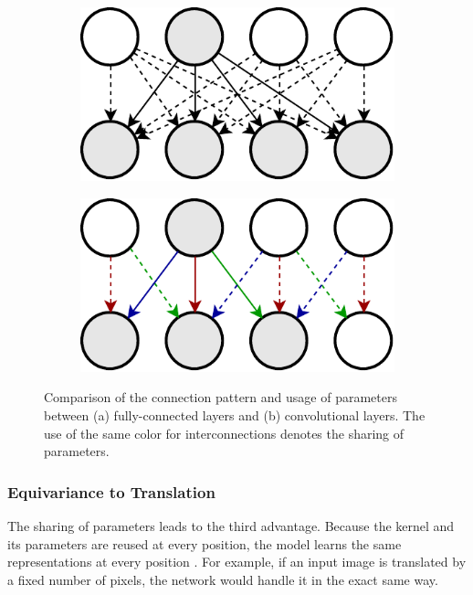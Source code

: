 \begin{figure}[htpb]
\centering
\begin{subfigure}{0.5\textwidth}
  \centering
  \includegraphics[width=.8\linewidth]{figures/fc2.pdf}
  \caption{}
  \label{fig:conv_vs_fc_fc}
\end{subfigure}%
\begin{subfigure}{0.5\textwidth}
  \centering
  \includegraphics[width=0.8\linewidth]{figures/param_share.pdf}
  \caption{}
  \label{fig:conv_vs_fc_conv}
\end{subfigure}
\caption[Sparse Connections and Parameter Sharing in CNNs]{Comparison of the connection pattern and usage of parameters between (a) fully-connected layers and (b) convolutional layers. The use of the same color for interconnections denotes the sharing of parameters.}
\label{fig:conv_vs_fc}
\end{figure}

\subsubsection*{Equivariance to Translation}
The sharing of parameters leads to the third advantage. Because the kernel and its parameters are reused at every position, the model learns the same representations at every position \parencite[p. 339]{deep_learning}. For example, if an input image is translated by a fixed number of pixels, the network would handle it in the exact same way.

